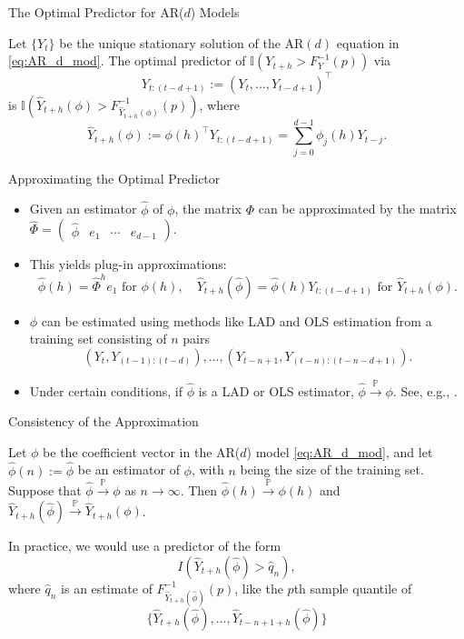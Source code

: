 \documentclass{beamer}
\def\I{\mathbb I}
\def\P{\mathbb P}
\newcommand{\AROptPred}[3]{\hat{Y}_{#1 + #2}(#3)}
\newcommand{\approxAROptPred}[3]{\hat{Y}_{#1 + #2}(\hat{#3})}
\begin{document}
\begin{frame}{The Optimal Predictor for AR($d$) Models}
    \begin{theorem}
        Let $\{Y_t\}$ be the unique stationary solution of the AR$(d)$ equation in \eqref{eq:AR_d_mod}.
        The optimal predictor of $\I(Y_{t + h} > F_Y^{-1}(p))$ via
        \[
        Y_{t:(t - d + 1)} := (Y_t, \ldots, Y_{t - d + 1})^{\top}
        \]
        is $\I(\AROptPred{t}{h}{\phi} > F_{\AROptPred{t}{h}{\phi}}^{-1}(p))$, where
        \[
        \AROptPred{t}{h}{\phi} := \phi(h)^{\top}Y_{t:(t - d + 1)} = \sum_{j = 0}^{d - 1} \phi_j(h)Y_{t - j}.
        \]
    \end{theorem}
\end{frame}

\begin{frame}{Approximating the Optimal Predictor}
    \begin{itemize}
        \item Given an estimator $\hat{\phi}$ of $\phi$, the matrix $\Phi$ can be approximated by the matrix $\hat{\Phi} = (\begin{matrix} \hat{\phi} & e_1 & \cdots & e_{d - 1} \end{matrix})$.
        \item This yields plug-in approximations:
        \[
        \hat{\phi}(h) = \hat{\Phi}^h e_1 \text{ for } \phi(h), \quad \approxAROptPred{t}{h}{\phi} = \hat{\phi}(h)Y_{t:(t - d + 1)} \text{ for } \AROptPred{t}{h}{\phi}.
        \]
        \item $\phi$ can be estimated using methods like LAD and OLS estimation from a training set consisting of $n$ pairs
        \[
        (Y_t, Y_{(t - 1):(t - d)}), \ldots, (Y_{t - n + 1}, Y_{(t - n):(t - n - d + 1)}).
        \]
        \item Under certain conditions, if $\hat{\phi}$ is a LAD or OLS estimator, $\hat{\phi} \xrightarrow{\P} \phi$. See, e.g., \cite{davis1992mest}.
    \end{itemize}
\end{frame}

\begin{frame}{Consistency of the Approximation}
    \begin{theorem}
        Let $\phi$ be the coefficient vector in the AR($d$) model \eqref{eq:AR_d_mod}, and let $\hat{\phi}(n) := \hat{\phi}$ be an estimator of $\phi$, with $n$ being the size of the training set. Suppose that $\hat{\phi} \xrightarrow{\P} \phi$ as $n \to \infty$. Then $\hat{\phi}(h) \xrightarrow{\P} \phi(h)$ and $\approxAROptPred{t}{h}{\phi} \xrightarrow{\P} \AROptPred{t}{h}{\phi}$.
    \end{theorem}
    In practice, we would use a predictor of the form
    \[
    I(\approxAROptPred{t}{h}{\phi} > \hat{q}_n),
    \]
    where $\hat{q}_n$ is an estimate of $F_{\approxAROptPred{t}{h}{\phi}}^{-1}(p)$, like the $p$th sample quantile of
    \[
    \{\approxAROptPred{t}{h}{\phi}, \ldots, \approxAROptPred{t - n + 1}{h}{\phi}\}
    \]
\end{frame}
\end{document}

